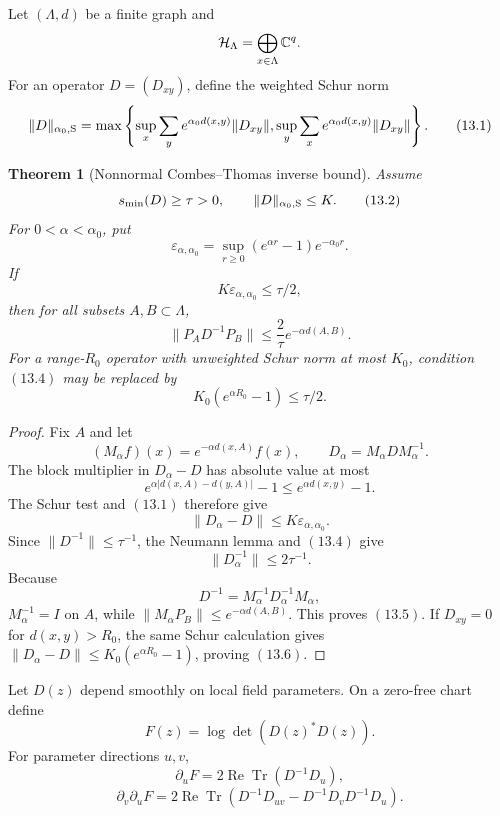 \documentclass[11pt]{article}
\newtheorem{theorem}{Theorem}[section]
\theoremstyle{remark}
\begin{document}
Let \((\Lambda,d)\) be a finite graph and
\[
 {\cal H}_\Lambda=\bigoplus_{x\in\Lambda}\mathbb C^q.
\]
For an operator \(D=(D_{xy})\), define the weighted Schur norm
\[
 \|D\|_{\alpha_0,{\rm S}}
 =\max\left\{
 \sup_x\sum_y e^{\alpha_0d(x,y)}\|D_{xy}\|,
 \sup_y\sum_x e^{\alpha_0d(x,y)}\|D_{xy}\|
 \right\}.                                                   \tag{13.1}
\]

\begin{theorem}[Nonnormal Combes--Thomas inverse bound]
\label{thm:v15v13-ct}
Assume
\[
 s_{\min}(D)\ge\tau>0,\qquad
 \|D\|_{\alpha_0,{\rm S}}\le K.                              \tag{13.2}
\]
For \(0<\alpha<\alpha_0\), put
\[
 \varepsilon_{\alpha,\alpha_0}
 =\sup_{r\ge0}(e^{\alpha r}-1)e^{-\alpha_0r}.                 \tag{13.3}
\]
If
\[
 K\varepsilon_{\alpha,\alpha_0}\le\tau/2,                    \tag{13.4}
\]
then for all subsets \(A,B\subset\Lambda\),
\[
 \boxed{
 \|P_AD^{-1}P_B\|
 \le\frac2\tau e^{-\alpha d(A,B)}.}                          \tag{13.5}
\]
For a range-\(R_0\) operator with unweighted Schur norm at most
\(K_0\), condition \((13.4)\) may be replaced by
\[
 K_0(e^{\alpha R_0}-1)\le\tau/2.                             \tag{13.6}
\]
\end{theorem}

\begin{proof}
Fix \(A\) and let
\[
 (M_\alpha f)(x)=e^{-\alpha d(x,A)}f(x),\qquad
 D_\alpha=M_\alpha DM_\alpha^{-1}.
\]
The block multiplier in \(D_\alpha-D\) has absolute value at most
\[
 e^{\alpha|d(x,A)-d(y,A)|}-1
 \le e^{\alpha d(x,y)}-1.
\]
The Schur test and \((13.1)\) therefore give
\[
 \|D_\alpha-D\|
 \le K\varepsilon_{\alpha,\alpha_0}.                         \tag{13.7}
\]
Since \(\|D^{-1}\|\le\tau^{-1}\), the Neumann lemma and
\((13.4)\) give
\[
 \|D_\alpha^{-1}\|\le2\tau^{-1}.                             \tag{13.8}
\]
Because
\[
 D^{-1}=M_\alpha^{-1}D_\alpha^{-1}M_\alpha,
\]
\(M_\alpha^{-1}=I\) on \(A\), while
\(\|M_\alpha P_B\|\le e^{-\alpha d(A,B)}\).  This proves
\((13.5)\).  If \(D_{xy}=0\) for \(d(x,y)>R_0\), the same Schur
calculation gives
\(\|D_\alpha-D\|\le K_0(e^{\alpha R_0}-1)\), proving
\((13.6)\).
\end{proof}

Let \(D(z)\) depend smoothly on local field parameters.  On a
zero-free chart define
\[
 F(z)=\log\det(D(z)^*D(z)).                                  \tag{13.9}
\]
For parameter directions \(u,v\),
\[
 \partial_uF=2\operatorname{Re}\operatorname{Tr}(D^{-1}D_u),
                                                                  \tag{13.10}
\]
\[
 \partial_v\partial_uF
 =2\operatorname{Re}\operatorname{Tr}
 \left(D^{-1}D_{uv}-D^{-1}D_vD^{-1}D_u\right).               \tag{13.11}
\]
\end{document}
